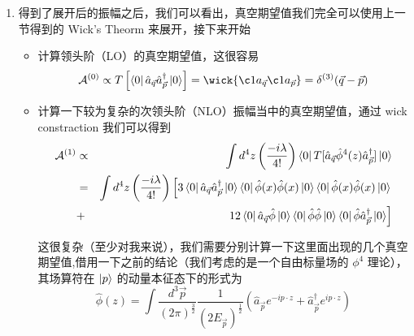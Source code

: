 \begin{example}
\begin{solution}
\begin{enumerate}
            于是，我们可以很自然的将振幅按照 $\lambda$ 的幂次来划分写作每一阶振幅的总和，即
            \begin{equation}
                \mathcal{A} = \mathcal{A}^{(0)} + \mathcal{A}^{(1)} + \mathcal{A}^{(2)} + \mathcal{A}^{(3)} + \cdots
            \end{equation}
            \item[Step 4] 得到了展开后的振幅之后，我们可以看出，真空期望值我们完全可以使用上一节得到的 Wick's Theorm 来展开，接下来开始
            \begin{itemize}
                \item 计算领头阶（LO）的真空期望值，这很容易
                \begin{equation*}
                    \mathcal{A}^{(0)} \propto T\left[\bra{0}\hat{a}_{\vec{q}}\hat{a}_{\vec{p}}^\dagger\ket{0}\right] = \wick{\c1 a_{\vec{q}} \c1 a_{\vec{p}}} = \delta^{(3)}(\vec{q} - \vec{p})
                \end{equation*}
                \item 计算一下较为复杂的次领头阶（NLO）振幅当中的真空期望值，通过 wick constraction 我们可以得到
                \begin{eqnarray*}
                    \mathcal{A}^{(1)} &\propto& \int d^4z \left(\frac{-i\lambda}{4!}\right)\bra{0}T[\hat{a}_{\vec{q}}\hat{\phi}^4(z)\hat{a}_{\vec{p}}^\dagger]\ket{0} \\
                    &=& \int d^4z \left(\frac{-i\lambda}{4!}\right)\left[3 \bra{0} \hat{a}_{\vec{q}}\hat{a}_{\vec{p}}^\dagger\ket{0}\bra{0} \hat{\phi}(x)\hat{\phi}(x) \ket{0}\bra{0} \hat{\phi}(x)\hat{\phi}(x) \ket{0} \right. \\
                    &+& \left.12 \bra{0} \hat{a}_{\vec{q}}\hat{\phi}\ket{0}\bra{0} \hat{\phi}\hat{\phi}\ket{0}\bra{0} \hat{\phi}\hat{a}_{\vec{p}}^\dagger\ket{0} \right]
                \end{eqnarray*}

                这很复杂（至少对我来说），我们需要分别计算一下这里面出现的几个真空期望值,借用一下之前的结论（我们考虑的是一个自由标量场的 $\phi^4$ 理论），其场算符在 $\ket{p}$ 的动量本征态下的形式为
                \begin{equation}
                    \hat{\phi}(z) = \int \frac{d^3 \vec{p}}{\left(2\pi\right)^{\frac{3}{2}}} \frac{1}{\left(2 E_{\vec{p}}\right)^{\frac{1}{2}}}\left(\hat{a}_{\vec{p}}e^{-ip \cdot z} + \hat{a}_{\vec{p}}^\dagger e^{ip \cdot z}\right)
                \end{equation}


\end{itemize}
\end{enumerate}
\end{solution}
\end{example}
